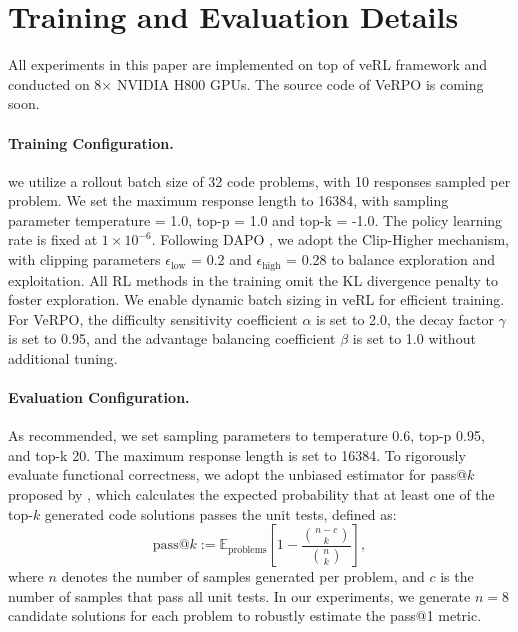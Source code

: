 \documentclass[11pt]{article}
\begin{document}
%


\appendix

\section{Training and Evaluation Details}
\label{sec:appendix_training_evaluation_details}
All experiments in this paper are implemented on top of veRL framework \cite{sheng2025hybridflow-verl} and conducted on 8× NVIDIA H800 GPUs. The source code of VeRPO is coming soon. 
\paragraph{Training Configuration.} we utilize a rollout batch size of 32 code problems, with 10 responses sampled per problem. We set the maximum response length to 16384, with sampling parameter temperature = 1.0, top-p = 1.0 and top-k = -1.0. The policy learning rate is fixed at $1 \times 10^{-6}$. Following DAPO \cite{yu2025dapo}, we adopt the Clip-Higher mechanism, with clipping parameters $\epsilon_\text{low}$ = 0.2 and $\epsilon_\text{high}$ = 0.28 to balance exploration and exploitation. All RL methods in the training omit the KL divergence penalty to foster exploration. We enable dynamic batch sizing in veRL for efficient training. For VeRPO, the difficulty sensitivity coefficient $\alpha$ is set to 2.0, the decay factor $\gamma$ is set to 0.95, and the advantage balancing coefficient $\beta$ is set to 1.0 without additional tuning.
\paragraph{Evaluation Configuration.} As \cite{yang2025qwen3} recommended, we set sampling parameters to temperature 0.6, top-p 0.95, and top-k 20. The maximum response length is set to 16384. To rigorously evaluate functional correctness, we adopt the unbiased estimator for pass@$k$ proposed by \citealp{chen2021humaneval}, which calculates the expected probability that at least one of the top-$k$ generated code solutions passes the unit tests, defined as:$$\text{pass}@k := \mathbb{E}_{\text{problems}} \left[ 1 - \frac{\binom{n-c}{k}}{\binom{n}{k}} \right],$$ where $n$ denotes the number of samples generated per problem, and $c$ is the number of samples that pass all unit tests. In our experiments, we generate $n=8$ candidate solutions for each problem to robustly estimate the pass@1 metric.
\end{document}
